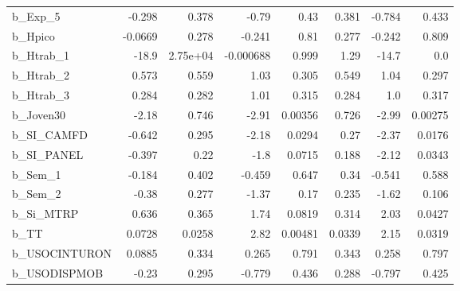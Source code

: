 \begin{tabular}{lrrrrrrr}
b\_Exp\_5       &  -0.298 &    0.378 &     -0.79 &     0.43 &         0.381 &       -0.784 &         0.433 \\
b\_Hpico       & -0.0669 &    0.278 &    -0.241 &     0.81 &         0.277 &       -0.242 &         0.809 \\
b\_Htrab\_1     &   -18.9 & 2.75e+04 & -0.000688 &    0.999 &          1.29 &        -14.7 &           0.0 \\
b\_Htrab\_2     &   0.573 &    0.559 &      1.03 &    0.305 &         0.549 &         1.04 &         0.297 \\
b\_Htrab\_3     &   0.284 &    0.282 &      1.01 &    0.315 &         0.284 &          1.0 &         0.317 \\
b\_Joven30     &   -2.18 &    0.746 &     -2.91 &  0.00356 &         0.726 &        -2.99 &       0.00275 \\
b\_SI\_CAMFD    &  -0.642 &    0.295 &     -2.18 &   0.0294 &          0.27 &        -2.37 &        0.0176 \\
b\_SI\_PANEL    &  -0.397 &     0.22 &      -1.8 &   0.0715 &         0.188 &        -2.12 &        0.0343 \\
b\_Sem\_1       &  -0.184 &    0.402 &    -0.459 &    0.647 &          0.34 &       -0.541 &         0.588 \\
b\_Sem\_2       &   -0.38 &    0.277 &     -1.37 &     0.17 &         0.235 &        -1.62 &         0.106 \\
b\_Si\_MTRP     &   0.636 &    0.365 &      1.74 &   0.0819 &         0.314 &         2.03 &        0.0427 \\
b\_TT          &  0.0728 &   0.0258 &      2.82 &  0.00481 &        0.0339 &         2.15 &        0.0319 \\
b\_USOCINTURON &  0.0885 &    0.334 &     0.265 &    0.791 &         0.343 &        0.258 &         0.797 \\
b\_USODISPMOB  &   -0.23 &    0.295 &    -0.779 &    0.436 &         0.288 &       -0.797 &         0.425 \\
\bottomrule
\end{tabular}

